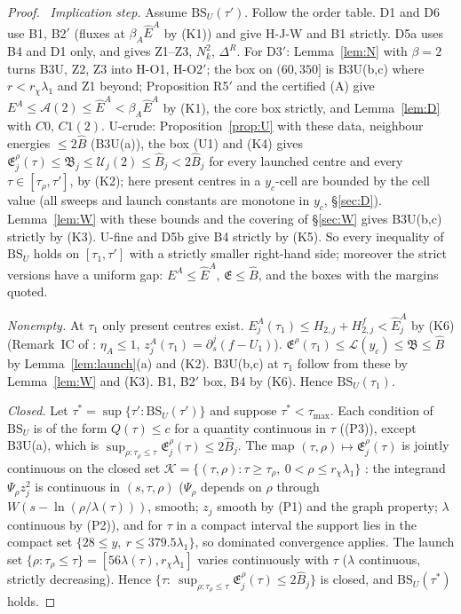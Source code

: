 \documentclass[11pt]{article}
\theoremstyle{definition}\newtheorem{definition}[theorem]{Definition}
\theoremstyle{remark}\newtheorem{remark}[theorem]{Remark}
\newcommand{\fn}[1]{\texttt{\detokenize{#1}}}
\newcommand{\E}{\mathfrak E}\newcommand{\B}{\mathfrak B}\newcommand{\Bh}{\hat B}\newcommand{\Eh}{\hat E^A}
\begin{document}
\begin{proof}\tP\ \emph{Implication step.} Assume $\mathrm{BS}_U(\tau')$. Follow the order table. D1 and D6 use B1, B2$'$ (fluxes at $\beta_A\Eh$ by (K1)) and give H-J-W and B1 strictly. D5a uses B4 and D1 only, and gives Z1--Z3, $N_k^2$, $\Delta^R$. For D3$'$: Lemma~\ref{lem:N} with $\beta=2$ turns B3U, Z2, Z3 into H-O1, H-O2$'$; the box on $(60,350]$ is B3U(b,c) where $r<r_\chi\lambda_1$ and Z1 beyond; Proposition R5$'$ and the certified (A) give $E^A\le\mathcal A(2)\le\Eh<\beta_A\Eh$ by (K1), the core box strictly, and Lemma~\ref{lem:D} with $C0$, $C1(2)$. U-crude: Proposition~\ref{prop:U} with these data, neighbour energies $\le2\Bh$ (B3U(a)), the box (U1) and (K4) gives $\E^\rho_j(\tau)\le\B_j\le\mathcal U_j(2)\le\Bh_j<2\Bh_j$ for every launched centre and every $\tau\in[\tau_\rho,\tau']$, by (K2); here present centres in a $y_c$-cell are bounded by the cell value (all sweeps and launch constants are monotone in $y_c$, \S\ref{sec:D}). Lemma~\ref{lem:W} with these bounds and the covering of \S\ref{sec:W} gives B3U(b,c) strictly by (K3). U-fine and D5b give B4 strictly by (K5). So every inequality of $\mathrm{BS}_U$ holds on $[\tau_1,\tau']$ with a strictly smaller right-hand side; moreover the strict versions have a uniform gap: $E^A\le\Eh$, $\E\le\Bh$, and the boxes with the margins quoted.

\emph{Nonempty.} At $\tau_1$ only present centres exist. $E^A_j(\tau_1)\le H_{2,j}+H^f_{2,j}<\Eh_j$ by (K6) (Remark~IC of \fn{STATEMENTS_r2.tex}: $\eta_A\le1$, $z^A_j(\tau_1)=\partial_s^j(f-U_1)$). $\E^\rho(\tau_1)\le\mathcal L(y_c)\le\B\le\Bh$ by Lemma~\ref{lem:launch}(a) and (K2). B3U(b,c) at $\tau_1$ follow from these by Lemma~\ref{lem:W} and (K3). B1, B2$'$ box, B4 by (K6). Hence $\mathrm{BS}_U(\tau_1)$.

\emph{Closed.} Let $\tau^*=\sup\{\tau':\mathrm{BS}_U(\tau')\}$ and suppose $\tau^*<\tau_{\max}$. Each condition of $\mathrm{BS}_U$ is of the form $Q(\tau)\le c$ for a quantity continuous in $\tau$ ((P3)), except B3U(a), which is $\sup_{\rho:\tau_\rho\le\tau}\E^\rho_j(\tau)\le2\Bh_j$. The map $(\tau,\rho)\mapsto\E^\rho_j(\tau)$ is jointly continuous on the closed set $\mathcal K=\{(\tau,\rho):\tau\ge\tau_\rho,\ 0<\rho\le r_\chi\lambda_1\}$ \tP: the integrand $\Psi_\rho z_j^2$ is continuous in $(s,\tau,\rho)$ ($\Psi_\rho$ depends on $\rho$ through $W(s-\ln(\rho/\lambda(\tau)))$, smooth; $z_j$ smooth by (P1) and the graph property; $\lambda$ continuous by (P2)), and for $\tau$ in a compact interval the support lies in the compact set $\{28\le y,\ r\le379.5\lambda_1\}$, so dominated convergence applies. The launch set $\{\rho:\tau_\rho\le\tau\}=[56\lambda(\tau),r_\chi\lambda_1]$ varies continuously with $\tau$ ($\lambda$ continuous, strictly decreasing). Hence $\{\tau:\ \sup_{\rho:\tau_\rho\le\tau}\E^\rho_j(\tau)\le2\Bh_j\}$ is closed, and $\mathrm{BS}_U(\tau^*)$ holds.


\end{proof}
\end{document}
